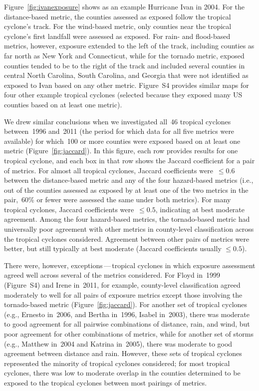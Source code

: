 Figure~\ref{fig:ivanexposure} shows as an example Hurricane Ivan in 2004.
For the distance-based metric, the counties assessed as exposed follow the
tropical cyclone's track. For the wind-based metric,
only counties near the tropical cyclone's first landfall were assessed as
exposed. For rain- and flood-based metrics, however, exposure extended to the
left of the track, including counties as far north as New York and Connecticut,
while for the tornado metric, exposed counties tended to be to the right of the
track and included several counties in central North Carolina, South Carolina,
and Georgia that were not identified as exposed to Ivan based on any other
metric. Figure~S4 provides similar maps for four other example tropical
cyclones (selected because they exposed many \ac{US}  counties based on at
least one metric).

We drew similar conclusions when we investigated all~46 tropical cyclones
between~1996 and~2011 (the period for which data for all five metrics were
available) for which~100 or more counties were exposed based on at least one
metric (Figure~\ref{fig:jaccard}). In this figure, each row provides results
for one tropical cyclone, and each box in that row shows the Jaccard
coefficient for a pair of metrics.  For almost all tropical cyclones, Jaccard
coefficients were~$\le0.6$ between the distance-based metric and any of the
four hazard-based metrics (i.e., out of the counties assessed as exposed by at
least one of the two metrics in the pair,~60\si{\percent} or fewer were
assessed the same under both metrics). For many tropical cyclones, Jaccard
coefficients were~$\le0.5$, indicating at best moderate agreement.  Among the
four hazard-based metrics, the tornado-based metric had universally poor
agreement with other metrics in county-level classification across the tropical
cyclones considered.  Agreement between other pairs of metrics were better, but
still typically at best moderate (Jaccard coefficients usually $\le0.5$).

There were, however, exceptions\,---\,tropical cyclones in which exposure
assessment agreed well across several of the metrics considered.  For Floyd
in~1999 (Figure~S4) and Irene in~2011, for example, county-level classification
agreed moderately to well for all pairs of exposure metrics except those
involving the tornado-based metric (Figure~\ref{fig:jaccard}). For another set
of tropical cyclones (e.g., Ernesto in~2006, and Bertha in~1996, Isabel
in~2003), there was moderate to good agreement for all pairwise combinations of
distance, rain, and wind, but poor agreement for other combinations of metrics,
while for another set of storms (e.g., Matthew in~2004 and Katrina in~2005),
there was moderate to good agreement between distance and rain.  However, these
sets of tropical cyclones represented the minority of tropical cyclones
considered; for most tropical cyclones, there was low to moderate overlap in
the counties determined to be exposed to the tropical cyclones between most
pairings of metrics.



